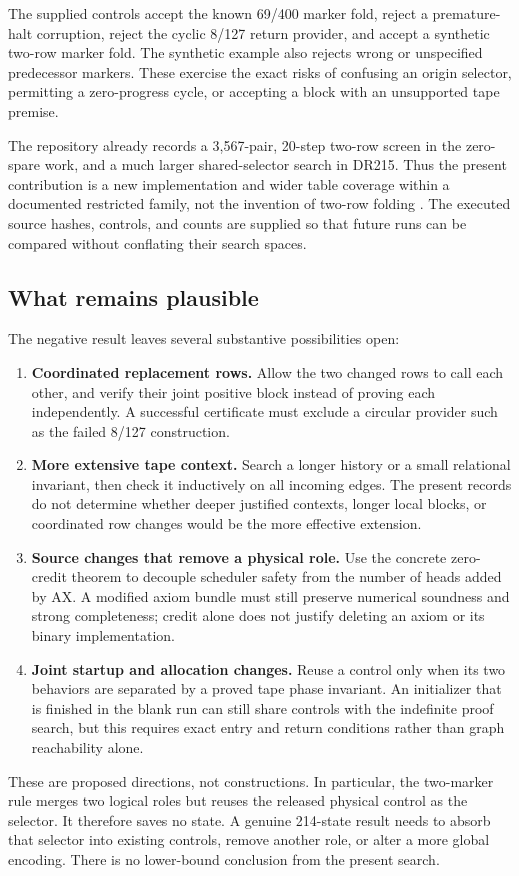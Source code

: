 The supplied controls accept the known 69/400 marker fold, reject a
premature-halt corruption, reject the cyclic 8/127 return provider, and
accept a synthetic two-row marker fold. The synthetic example also rejects
wrong or unspecified predecessor markers. These exercise the exact risks
of confusing an origin selector, permitting a zero-progress cycle, or
accepting a block with an unsupported tape premise.

The repository already records a 3,567-pair, 20-step two-row screen in the
zero-spare work, and a much larger shared-selector search in DR215. Thus
the present contribution is a new implementation and wider table coverage
within a documented restricted family, not the invention of two-row
folding \cite{searchprior}. The executed source hashes, controls, and counts
are supplied so that future runs can be compared without conflating their
search spaces.

\subsection{What remains plausible}

The negative result leaves several substantive possibilities open:
\begin{enumerate}
\item \textbf{Coordinated replacement rows.} Allow the two changed rows to
call each other, and verify their joint positive block instead of proving
each independently. A successful certificate must exclude a circular
provider such as the failed 8/127 construction.
\item \textbf{More extensive tape context.} Search a longer history or a
small relational invariant, then check it inductively on all incoming
edges. The present records do not determine whether deeper justified
contexts, longer local blocks, or coordinated row changes would be the
more effective extension.
\item \textbf{Source changes that remove a physical role.} Use the concrete
zero-credit theorem to decouple scheduler safety from the number of heads
added by AX. A modified axiom bundle must still preserve numerical
soundness and strong completeness; credit alone does not justify deleting
an axiom or its binary implementation.
\item \textbf{Joint startup and allocation changes.} Reuse a control only
when its two behaviors are separated by a proved tape phase invariant.
An initializer that is finished in the blank run can still share controls
with the indefinite proof search, but this requires exact entry and return
conditions rather than graph reachability alone.
\end{enumerate}

These are proposed directions, not constructions. In particular, the
two-marker rule merges two logical roles but reuses the released physical
control as the selector. It therefore saves no state. A genuine 214-state
result needs to absorb that selector into existing controls, remove
another role, or alter a more global encoding. There is no lower-bound
conclusion from the present search.
